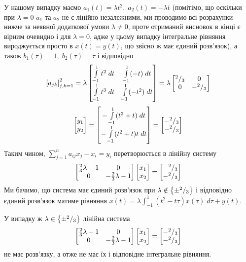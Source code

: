 \documentclass[12pt]{article} %
\newcommand{\dt}{\;dt}
\begin{document}
У нашому випадку маємо $a_1(t)=\lambda t^2,\;a_2(t)=-\lambda t$ (помітімо, що оскільки при $\lambda=0$
$a_1$ та $a_2$ не є лінійно незалежними, ми проводимо всі розрахунки нижче за неявної додаткової умови
$\lambda\neq0$, проте отриманий висновок в кінці є вірним очевидно і для $\lambda=0$, адже у цьому
випадку інтегральне рівняння вироджується просто в $x(t)=y(t)$, що звісно ж 
має єдиний розв’язок), а також $b_1(\tau)=1,\;b_2(\tau)=\tau$ і відповідно
\[\mysbra{a_{jk}}_{j,k=1}^2=\lambda\begin{bmatrix}
	\int_{-1}^1t^2\dt&\int_{-1}^1(-t)\dt\\
	\int_{-1}^1t^3\dt&\int_{-1}^1(-t^2)\dt
\end{bmatrix}=\lambda\begin{bmatrix}\myfrac{2}{3}&0\\0&-\myfrac{2}{3}\end{bmatrix}\]
	\[\begin{bmatrix}y_1\\y_2\end{bmatrix}=
		\begin{bmatrix}-\int_{-1}^1(t^2+t)\dt\\-\int_{-1}^1(t^2+t)t\dt\end{bmatrix}=
			\begin{bmatrix}-\myfrac{2}{3}\\-\myfrac{2}{3}
		\end{bmatrix}
		\]
Таким чином, $\sum_{j=1}^na_{ij}x_j-x_i=y_i$ перетворюється в лінійну систему
\[\begin{bmatrix}\frac{2}{3}\lambda-1&0\\0&-\frac{2}{3}\lambda-1\end{bmatrix}\begin{bmatrix}x_1\\x_2\end{bmatrix}=
	\begin{bmatrix}-{^{2}/_{3}}\\-{^{2}/_{3}}\end{bmatrix}\]
		Ми бачимо, що система має єдиний розв’язок при $\lambda\notin\left\{\pm{^{2}/_{3}}\right\}$ і відповідно єдиний розв’язок матиме
		рівняння  $x(t)=\lambda\int_{-1}^1(t^2-t\tau)x(\tau)\;d\tau+y(t)$.

		У випадку ж $\lambda\in\left\{\pm{^{2}/_{3}}\right\}$ лінійна система
		\[\begin{bmatrix}\frac{2}{3}\lambda-1&0\\0&-\frac{2}{3}\lambda-1\end{bmatrix}\begin{bmatrix}x_1\\x_2\end{bmatrix}=
	\begin{bmatrix}-{^{2}/_{3}}\\-{^{2}/_{3}}\end{bmatrix}\]
		не має розв’язку, а отже не має їх і відповідне інтегральне рівняння.
\end{document}
